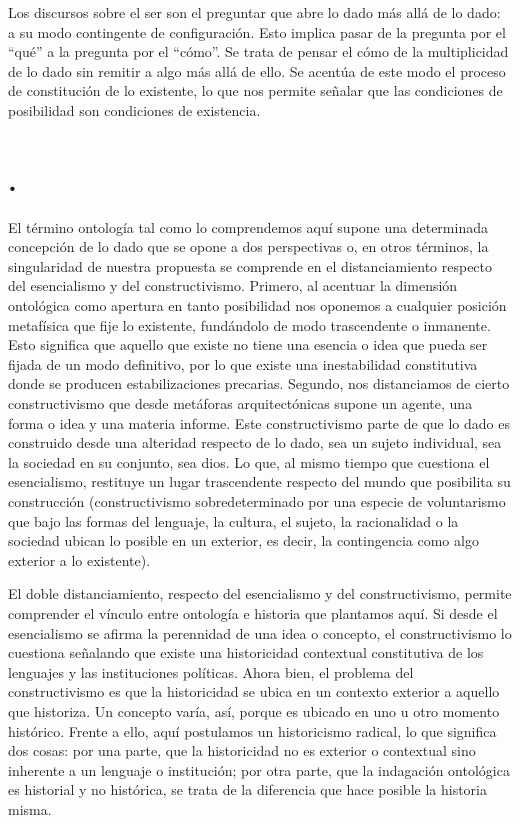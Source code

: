 Los discursos sobre el ser son el preguntar que abre lo dado más allá de lo dado: a su modo contingente de configuración. Esto implica pasar de la pregunta por el \enquote{qué} a la pregunta por el \enquote{cómo}. Se trata de pensar el cómo de la multiplicidad de lo dado sin remitir a algo más allá de ello. Se acentúa de este modo el proceso de constitución de lo existente, lo que nos permite señalar que las condiciones de posibilidad son condiciones de existencia.

\section*{.}

El término ontología tal como lo comprendemos aquí supone una determinada concepción de lo dado que se opone a dos perspectivas o, en otros términos, la singularidad de nuestra propuesta se comprende en el distanciamiento respecto del esencialismo y del constructivismo. Primero, al acentuar la dimensión ontológica como apertura en tanto posibilidad nos oponemos a cualquier posición metafísica que fije lo existente, fundándolo de modo trascendente o inmanente. Esto significa que aquello que existe no tiene una esencia o idea que pueda ser fijada de un modo definitivo, por lo que existe una inestabilidad constitutiva donde se producen estabilizaciones precarias. Segundo, nos distanciamos de cierto constructivismo que desde metáforas arquitectónicas supone un agente, una forma o idea y una materia informe. Este constructivismo parte de que lo dado es construido desde una alteridad respecto de lo dado, sea un sujeto individual, sea la sociedad en su conjunto, sea dios. Lo que, al mismo tiempo que cuestiona el esencialismo, restituye un lugar trascendente respecto del mundo que posibilita su construcción (constructivismo sobredeterminado por una especie de voluntarismo que bajo las formas del lenguaje, la cultura, el sujeto, la racionalidad o la sociedad ubican lo posible en un exterior, es decir, la contingencia como algo exterior a lo existente).

El doble distanciamiento, respecto del esencialismo y del constructivismo, permite comprender el vínculo entre ontología e historia que plantamos aquí. Si desde el esencialismo se afirma la perennidad de una idea o concepto, el constructivismo lo cuestiona señalando que existe una historicidad contextual constitutiva de los lenguajes y las instituciones políticas. Ahora bien, el problema del constructivismo es que la historicidad se ubica en un contexto exterior a aquello que historiza. Un concepto varía, así, porque es ubicado en uno u otro momento histórico. Frente a ello, aquí postulamos un historicismo radical, lo que significa dos cosas: por una parte, que la historicidad no es exterior o contextual sino inherente a un lenguaje o institución; por otra parte, que la indagación ontológica es historial y no histórica, se trata de la diferencia que hace posible la historia misma.

